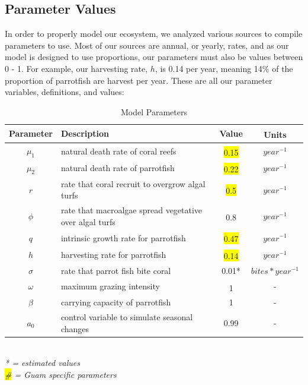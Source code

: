 \documentclass[12pt]{article}
\begin{document}
\subsection{Parameter Values}
In order to properly model our ecosystem, we analyzed various sources to compile parameters to use. Most of our sources are annual, or yearly, rates, and as our model is designed to use proportions, our parameters must also be values between 0 - 1. For example, our harvesting rate, $h$, is 0.14 per year, meaning 14\% of the proportion of parrotfish are harvest per year. These are all our parameter variables, definitions, and values:
\begin{table}[H]
    \centering
    \begin{tabular}{c p{9cm} c c}
        \hline
        Parameter & Description & Value & Units\textsuperscript{\cite{12_noaa_report}\cite{04_mathanalysis}\cite{13_blackwood_hastings_mumby_2010}}\\
        \hline
        \hline
        $\mu_{1}$ & natural death rate of coral reefs & \colorbox{yellow}{0.15}\textsuperscript{\cite{16_wolanski_richmond_mccook_2004}} & $year^{-1}$\\ %
        $\mu_{2}$ & natural death rate of parrotfish & \colorbox{yellow}{0.22}\textsuperscript{\cite{12_noaa_report}} & $year^{-1}$\\ %
        $r$ & rate that coral recruit to overgrow algal turfs & \colorbox{yellow}{0.5}\textsuperscript{\cite{16_wolanski_richmond_mccook_2004}} & $year^{-1}$\\ %
        $\phi$ & rate that macroalgae spread vegetative over algal turfs & 0.8\textsuperscript{\cite{04_mathanalysis}} & $year^{-1}$\\ %
        $q$ & intrinsic growth rate for parrotfish & \colorbox{yellow}{0.47}\textsuperscript{\cite{12_noaa_report}} & $year^{-1}$\\ %
        $h$ & harvesting rate for parrotfish & \colorbox{yellow}{0.14}\textsuperscript{\cite{12_noaa_report}} & $year^{-1}$\\ %
        $\sigma$ & rate that parrot fish bite coral & 0.01*& $bites*year^{-1}$\\
        $\omega$ & maximum grazing intensity & 1\textsuperscript{\cite{13_blackwood_hastings_mumby_2010}} & -\\
        $\beta$ & carrying capacity of parrotfish & 1 & -\\
        $a_{0}$ & control variable to simulate seasonal changes & 0.99 & - \\%
        \hline
    \end{tabular}
    \caption{Model Parameters}
    \label{tab:parameters}
\end{table}\\
\textit{* = estimated values}\\
\textit{\colorbox{yellow}{\#} = Guam specific parameters}
\end{document}
